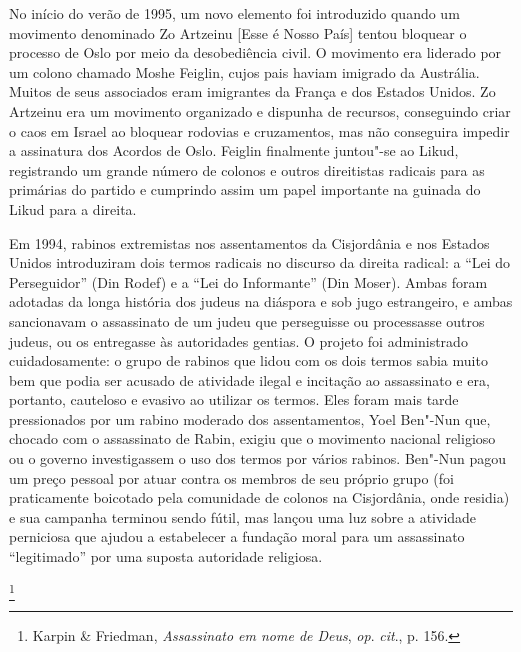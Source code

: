 No início do verão de 1995, um novo elemento foi introduzido quando um
movimento denominado Zo Artzeinu {[}Esse é Nosso País{]} tentou bloquear o
processo de Oslo por meio da desobediência civil. O movimento era
liderado por um colono chamado Moshe Feiglin, cujos pais haviam imigrado
da Austrália. Muitos de seus associados eram imigrantes da França e dos
Estados Unidos. Zo Artzeinu era um movimento organizado e dispunha de
recursos, conseguindo criar o caos em Israel ao bloquear rodovias e
cruzamentos, mas não conseguira impedir a assinatura dos Acordos
de Oslo. Feiglin finalmente juntou"-se ao Likud, registrando um grande
número de colonos e outros direitistas radicais para as primárias do
partido e cumprindo assim um papel importante na guinada do Likud para a
direita.

Em 1994, rabinos extremistas nos assentamentos da Cisjordânia e nos
Estados Unidos introduziram dois termos radicais no discurso da direita
radical: a ``Lei do Perseguidor'' (Din Rodef) e a ``Lei do Informante''
(Din Moser). Ambas foram adotadas da longa história dos judeus na
diáspora e sob jugo estrangeiro, e ambas sancionavam o assassinato de um
judeu que perseguisse ou processasse outros judeus, ou os entregasse às
autoridades gentias. O projeto foi administrado cuidadosamente: o grupo
de rabinos que lidou com os dois termos sabia muito bem que podia ser
acusado de atividade ilegal e incitação ao assassinato e era, portanto,
cauteloso e evasivo ao utilizar os termos. Eles foram mais tarde
pressionados por um rabino moderado dos assentamentos, Yoel Ben"-Nun que,
chocado com o assassinato de Rabin, exigiu que o movimento nacional
religioso ou o governo investigassem o uso dos termos por vários
rabinos. Ben"-Nun pagou um preço pessoal por atuar contra os membros de
seu próprio grupo (foi praticamente boicotado pela comunidade de colonos
na Cisjordânia, onde residia) e sua campanha terminou sendo fútil, mas
lançou uma luz sobre a atividade perniciosa que ajudou a estabelecer a
fundação moral para um assassinato ``legitimado'' por uma suposta
autoridade religiosa.

\footnote{Karpin \& Friedman, 
\textit{Assassinato em nome de Deus}, \textit{op}. \textit{cit}., p. 156.}

